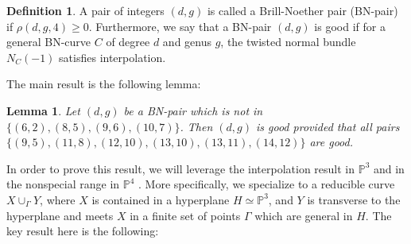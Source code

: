 \documentclass[11pt]{amsart}
\newcommand{\pp}{\mathbb{P}}
\newtheorem{lem}[thm]{Lemma}
\newcommand{\defi}[1]{\textsf{#1}}
\theoremstyle{definition}
\newtheorem{defin}[thm]{Definition}
\theoremstyle{remark}
\begin{document}
\begin{defin}
A pair of integers $(d,g)$ is called a \defi{Brill-Noether} pair (BN-pair) if $\rho(d,g,4) \geq 0$.  Furthermore, we say that a BN-pair $(d,g)$ is \defi{good} if for a general BN-curve $C$ of degree $d$ and genus $g$, the twisted normal bundle $N_C(-1)$ satisfies interpolation.
\end{defin}

The main result is the following lemma:

\begin{lem}\label{cut_to_finite}
Let $(d,g)$ be a BN-pair which is not in $\{(6,2), (8,5), (9,6), (10,7) \}$.  Then $(d,g)$ is good provided that all pairs $\{(9,5), (11,8), (12,10), (13,10), (13,11), (14,12) \} $ are good.
\end{lem}

In order to prove this result, we will leverage the interpolation result in $\pp^3$ \cite[Theorem 1.1]{vogt} and in the nonspecial range in $\pp^4$ \cite{joint}.  More specifically, we specialize to a reducible curve $X \cup_\Gamma Y$, where $X$ is contained in a hyperplane
$H \simeq \pp^3$, and $Y$ is transverse to the hyperplane and meets $X$ in a finite set of
points $\Gamma$ which are general in $H$.  The key result here is the following:
\end{document}
